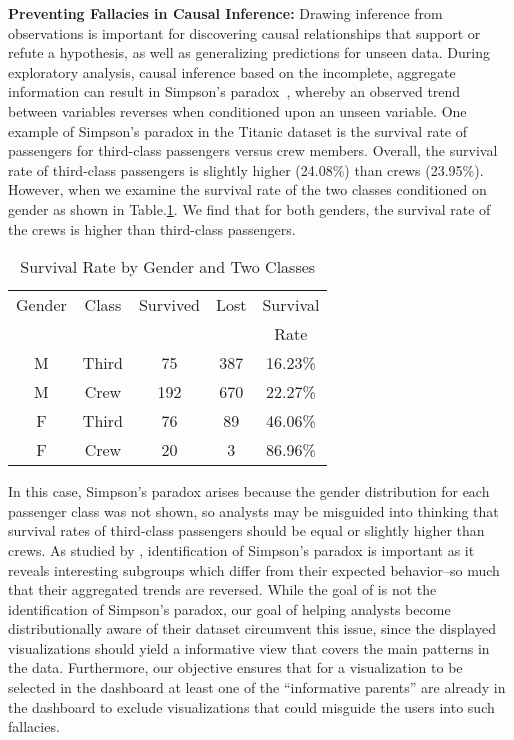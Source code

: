 \npar \textbf{Preventing Fallacies in Causal Inference:} Drawing inference from observations is important for discovering causal relationships that support or refute a hypothesis, as well as generalizing predictions for unseen data. During exploratory analysis, causal inference based on the incomplete, aggregate information can result in Simpson's paradox~\cite{Guo2017}, whereby an observed trend between variables reverses when conditioned upon an unseen variable. 
\npar One example of Simpson's paradox in the Titanic dataset is the survival rate of passengers for third-class passengers versus crew members. Overall, the survival rate of third-class passengers is slightly higher (24.08\%) than crews (23.95\%). However, when we examine the survival rate of the two classes conditioned on gender as shown in Table.\ref{tab:t2}. We find that for both genders, the survival rate of the crews is higher than third-class passengers.  
\begin{table}[thb]
	\caption{Survival Rate by Gender and Two Classes}
    \label{tab:t2}
	\begin{center}    
	\begin{tabular}{ccccc}
	\toprule
	Gender & Class & Survived & Lost & Survival\\
	& & & & Rate\\
	\midrule
	M & Third & 75 & 387 & 16.23\%\\ 
	M & Crew & 192 & 670 & 22.27\%\\ 
	\bottomrule
    F & Third & 76 & 89 & 46.06\%\\ 
	F & Crew & 20 & 3 & 86.96\%\\ 
	\bottomrule
	\end{tabular}
    \end{center}
\end{table}
In this case, Simpson's paradox arises because the gender distribution for each passenger class was not shown, so analysts may be misguided into thinking that survival rates of third-class passengers should be equal or slightly higher than crews. As studied by \cite{Alipourfard2018,Guo2017}, identification of Simpson's paradox is important as it reveals interesting subgroups which differ from their expected behavior--so much that their aggregated trends are reversed. While the goal of \system is not the identification of Simpson's paradox, our goal of helping analysts become distributionally aware of their dataset circumvent this issue, since the displayed visualizations should yield a informative view that covers the main patterns in the data. Furthermore, our objective ensures that for a visualization to be selected in the dashboard at least one of the ``informative parents'' are already in the dashboard to exclude visualizations that could misguide the users into such fallacies. 

